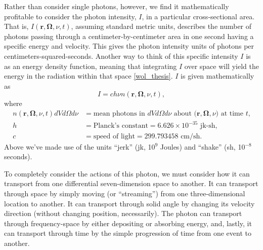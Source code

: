 Rather than consider single photons, however, we find it mathematically profitable to consider the photon intensity, $I$, in a particular cross-sectional area.  That is, $I(\mathbf{r}, \mathbf{\Omega}, \nu, t)$, assuming standard metric units, describes the number of photons passing through a centimeter-by-centimeter area in one second having a specific energy and velocity.  This gives the photon intensity units of photons per centimeters-squared-seconds.  Another way to think of this specific intensity $I$ is as an energy density function, meaning that integrating $I$ over space will yield the energy in the radiation within that space \ref{wol_thesis}.  $I$ is given mathematically as
\begin{equation}
I=ch\nu n(\mathbf{r},\mathbf{\Omega},\nu,t),
\end{equation}
where
\begin{align}
n(\mathbf{r},\mathbf{\Omega},\nu,t)dVd\Omega d\nu &= \mbox{mean photons in $dVd\Omega d\nu$ about ($\mathbf{r},\mathbf{\Omega},\nu$) at time $t$,}\\
h&=\mbox{Planck's constant}=6.626\times10^{-35}\mbox{ jk-sh},\\
c&=\mbox{speed of light}=299.793458 \mbox{ cm/sh}.
\end{align}
Above we've made use of the units ``jerk'' (jk, 10$^9$ Joules) and ``shake'' (sh, 10$^{-8}$ seconds).

To completely consider the actions of this photon, we must consider how it can transport from one differential seven-dimension space to another.  It can transport through space by simply moving (or ``streaming'') from one three-dimensional location to another.  It can transport through solid angle by changing its velocity direction (without changing position, necessarily).  The photon can transport through frequency-space by either depositing or absorbing energy, and, lastly, it can transport through time by the simple progression of time from one event to another.

